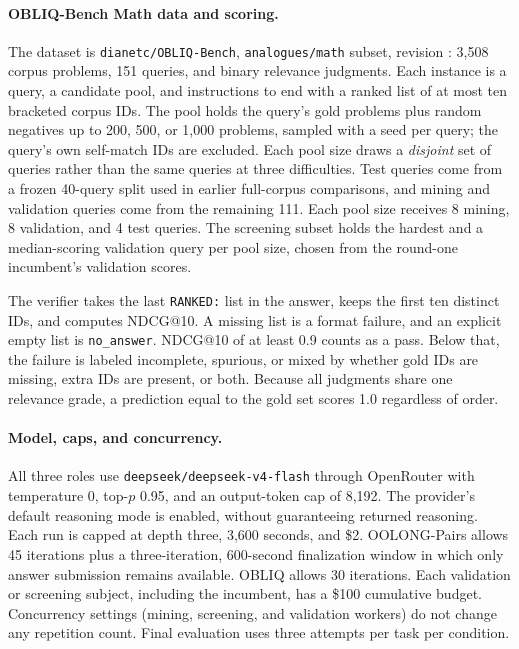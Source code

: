 \paragraph{OBLIQ-Bench Math data and scoring.}
The dataset is \texttt{dianetc/OBLIQ-Bench}, \texttt{analogues/math} subset,
revision : 3,508 corpus problems,
151 queries, and binary relevance judgments. Each instance is a query, a
candidate pool, and instructions to end with a ranked list of at most ten
bracketed corpus IDs. The pool holds the query's gold problems plus random
negatives up to 200, 500, or 1,000 problems, sampled with a seed per query;
the query's own self-match IDs are excluded. Each pool size draws a
\emph{disjoint} set of queries rather than the same queries at three
difficulties. Test queries come from a frozen 40-query split used in earlier
full-corpus comparisons, and mining and validation queries come from the
remaining 111. Each pool size receives 8 mining, 8 validation, and 4 test
queries. The screening subset holds the hardest and a median-scoring validation
query per pool size, chosen from the round-one incumbent's validation scores.

The verifier takes the last \texttt{RANKED:} list in the answer, keeps the first
ten distinct IDs, and computes NDCG@10. A missing list is a format failure, and
an explicit empty list is \texttt{no\_answer}. NDCG@10 of at least 0.9 counts as
a pass. Below that, the failure is labeled incomplete, spurious, or mixed by
whether gold IDs are missing, extra IDs are present, or both. Because all
judgments share one relevance grade, a prediction equal to the gold set scores
1.0 regardless of order.

\paragraph{Model, caps, and concurrency.}
All three roles use \texttt{deepseek/deepseek-v4-flash} through OpenRouter with
temperature 0, top-$p$ 0.95, and an output-token cap of 8,192. The provider's
default reasoning mode is enabled, without guaranteeing returned reasoning.
Each run is capped at depth three, 3,600 seconds, and \$2. OOLONG-Pairs allows 45
iterations plus a three-iteration, 600-second finalization window in which only
answer submission remains available. OBLIQ allows 30 iterations. Each validation
or screening subject, including the incumbent, has a \$100 cumulative budget.
Concurrency settings (mining, screening, and validation workers) do not change
any repetition count. Final evaluation uses three attempts per task per
condition.


